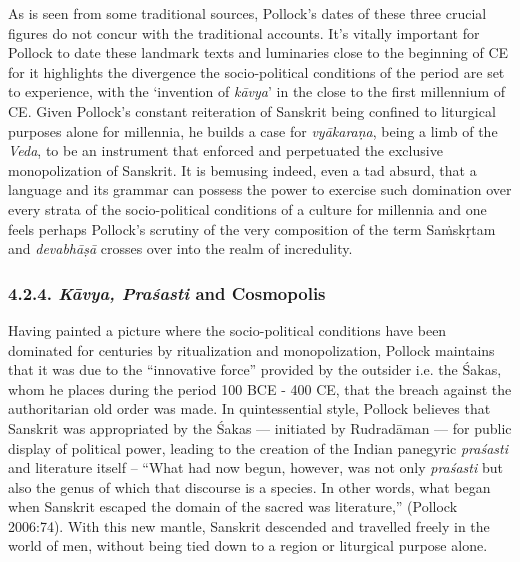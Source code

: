 As is seen from some traditional sources, Pollock’s dates of these three crucial figures do not concur with the traditional accounts. It’s vitally important for Pollock to date these landmark texts and luminaries close to the beginning of CE for it highlights the divergence the socio-political conditions of the period are set to experience, with the ‘invention of \textit{kāvya}’ in the close to the first millennium of CE. Given Pollock’s constant reiteration of Sanskrit being confined to liturgical purposes alone for millennia, he builds a case for \textit{vyākaraṇa}, being a limb of the \textit{Veda}, to be an instrument that enforced and perpetuated the exclusive monopolization of Sanskrit. It is bemusing indeed, even a tad absurd, that a language and its grammar can possess the power to exercise such domination over every strata of the socio-political conditions of a culture for millennia and one feels perhaps Pollock’s scrutiny of the very composition of the term Saṁskṛtam and \textit{devabhāṣā} crosses over into the realm of incredulity.

\vspace{-.5cm}

\subsubsection*{4.2.4. \textit{Kāvya, Praśasti} and Cosmopolis}

\vspace{-.3cm}

Having painted a picture where the socio-political conditions have been dominated for centuries by ritualization and monopolization, Pollock maintains that it was due to the “innovative force” provided by the outsider i.e. the Śakas, whom he places during the period 100 BCE - 400 CE, that the breach against the authoritarian old order was made. In quintessential style, Pollock believes that Sanskrit was appropriated by the Śakas — initiated by Rudradāman — for public display of political power, leading to the creation of the Indian panegyric \textit{praśasti} and literature itself – “What had now begun, however, was not only \textit{praśasti} but also the genus of which that discourse is a species. In other words, what began when Sanskrit escaped the domain of the sacred was literature,” (Pollock 2006:74). With this new mantle, Sanskrit descended and travelled freely in the world of men, without being tied down to a region or liturgical purpose alone.


